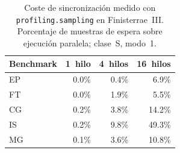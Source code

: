 \begin{table}[htbp]
\centering
\small
\begin{tabular}{lrrr}
\hline
Benchmark & 1~hilo & 4~hilos & 16~hilos \\
\hline
EP & 0.0\% & 0.4\% & 6.9\% \\
FT & 0.0\% & 1.9\% & 5.5\% \\
CG & 0.2\% & 3.8\% & 14.2\% \\
IS & 0.2\% & 9.8\% & 49.3\% \\
MG & 0.1\% & 3.6\% & 10.8\% \\
\hline
\end{tabular}
\caption{Coste de sincronización medido con \texttt{profiling.sampling} en
Finisterrae~III. Porcentaje de muestras de espera sobre ejecución paralela;
clase~S, modo~1.}
\label{tab:profiling-py315-sync}
\end{table}
